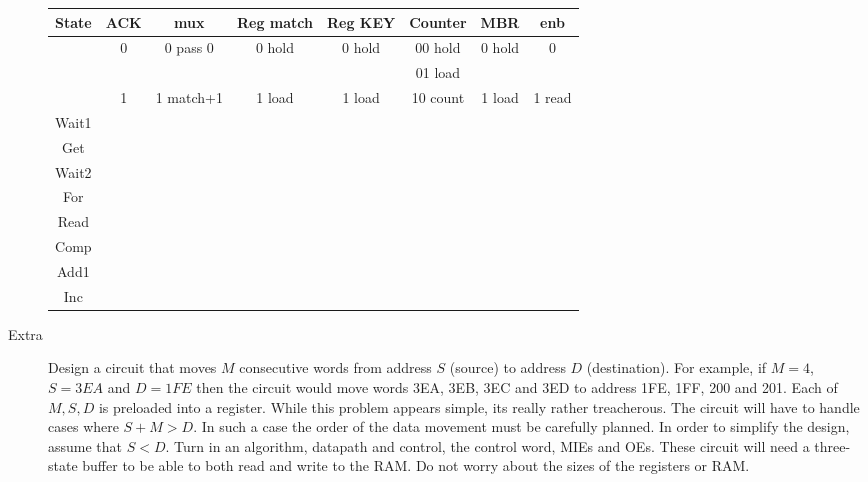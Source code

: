 \begin{description}
{\tiny
\begin{tabular}{c||c|c|c|c|c|c|c}  
State   & ACK   & mux       &  Reg match& Reg KEY & Counter     & MBR    & enb             \\ \hline
        & 0     & 0 pass 0  &  0 hold   & 0 hold  & 00 hold     & 0 hold & 0      \\ \hline
        &       &           &           &         & 01 load     &        &               \\ \hline
        & 1     & 1 match+1 &  1 load   & 1 load  & 10 count    & 1 load & 1 read  \\ \hline \hline
Wait1   &      &          &          &        &           &       &               \\ \hline
Get     &      &          &          &        &           &       &             \\ \hline
Wait2   &      &          &          &        &           &       &             \\ \hline
For     &      &          &          &        &           &       &           \\ \hline
Read    &      &          &          &        &           &       &             \\ \hline
Comp    &      &          &          &        &           &       &             \\ \hline
Add1    &      &          &          &        &           &       &        \\ \hline
Inc     &      &          &          &        &           &       &            \\ 
\end{tabular} }

\pagebreak

\item [Extra]
Design a circuit that moves $M$ consecutive words from address $S$ (source) to
address $D$ (destination).  For example, if $M=4$, $S=3EA$ and $D=1FE$ then the
circuit would move words 3EA, 3EB, 3EC and 3ED to address 1FE, 1FF, 200 and 201.
Each of $M,S,D$ is preloaded into a register.  While this problem appears simple,
its really rather treacherous.  The circuit will have to handle cases where
$S+M > D$.  In such a case the order of the data movement must be carefully planned.
In order to simplify the design, assume that $S<D$.  Turn in an algorithm,
datapath and control, the
control word, MIEs and OEs.  These circuit will need a three-state buffer to
be able to both read and write to the RAM.  Do not worry about the sizes of the
registers or RAM.


\end{description}
